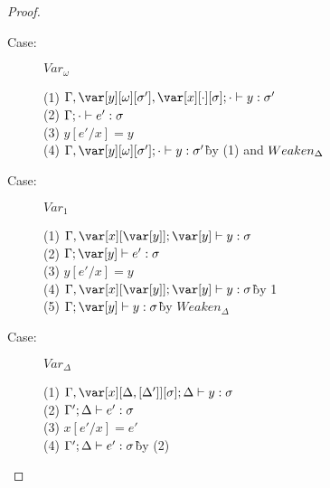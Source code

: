 \begin{proof}
\begin{description}
%
%
\item[Case:] $Var_\omega$
\begin{tabbing}
    (1) $\G, \yo, \x[\cdot][\s]; \cdot \vdash y : \s'$\\
    (2) $\Gamma; \cdot \vdash e' : \sigma$\\
    (3) $y[e'/x] = y$\\
    (4) $\G,\yo;\cdot \vdash y : \s'$\` by (1) and $Weaken_\Delta$\\
\end{tabbing}

\item[Case:] $Var_1$
\begin{tabbing}
  (1) $\G,\x[\y]; \y \vdash y : \s$\\
  (2) $\G; \y \vdash e' : \s$\\
  (3) $y[e'/x] = y$\\
  (4) $\G,\x[\y]; \y \vdash y : \s$\`by 1\\ 
  (5) $\G; \y\vdash y : \s$\` by $Weaken_\Delta$\\
\end{tabbing}

\item[Case:] $Var_\Delta$
\begin{tabbing}
    (1) $\G, \xD; \D \vdash y : \s$\\
    (2) $\Gamma'; \Delta \vdash e' : \sigma$\\
    (3) $x[e'/x] = e'$\\
    (4) $\Gamma'; \Delta \vdash e' : \sigma$\` by (2)\\
\end{tabbing}


\end{description}
\end{proof}

